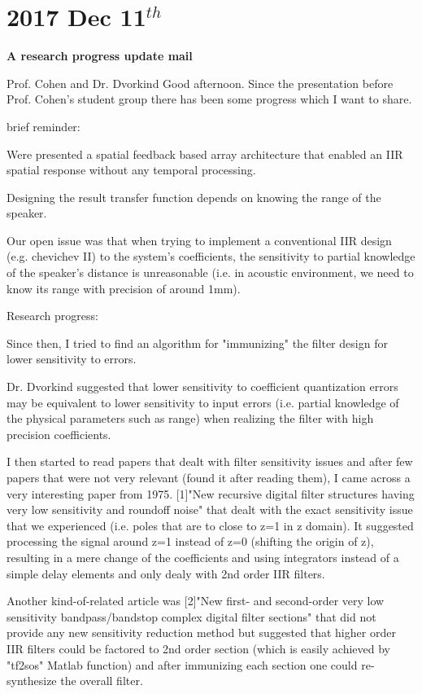 \documentclass[12pt]{article}
\begin{document}
\section{2017 Dec 11$^{th}$}
\textbf{A research progress update mail} 

\begin{mdframed}
Prof. Cohen and Dr. Dvorkind 
Good afternoon. 
Since the presentation before Prof. Cohen's student group there has been some progress which I want to share.

brief reminder:

Were presented a spatial feedback based array architecture that enabled an IIR spatial response without any temporal processing.

Designing the result transfer function depends on knowing the range of the speaker. 

Our open issue was that when trying to implement a conventional IIR design (e.g. chevichev II) to the system's coefficients, the sensitivity to partial knowledge of the speaker's distance is unreasonable (i.e. in acoustic environment, we need to know its range with precision of around 1mm).

Research progress:

Since then, I tried to find an algorithm for "immunizing" the filter design for lower sensitivity to errors.

Dr. Dvorkind suggested that lower sensitivity to coefficient quantization errors may be equivalent to lower sensitivity to input errors (i.e. partial knowledge of the physical parameters such as range) when realizing the filter with high precision coefficients.

I then started to read papers that dealt with filter sensitivity issues and after few papers that were not very relevant (found it after reading them), I came across a very interesting paper from 1975.
[1]"New recursive digital filter structures having very low sensitivity and roundoff noise"
that dealt with the exact sensitivity issue that we experienced (i.e. poles that are to close to z=1 in z domain).
It suggested processing the signal around z=1 instead of z=0 (shifting the origin of z), resulting in a mere change of the coefficients and using integrators instead of a simple delay elements and only dealy with 2nd order IIR filters.

Another kind-of-related article was 
[2]"New first- and second-order very low sensitivity bandpass/bandstop complex digital filter sections"
that did not provide any new sensitivity reduction method but suggested that higher order IIR filters could be factored to 2nd order section (which is easily achieved by "tf2sos" Matlab function) and after immunizing each section one could re-synthesize the overall filter.


\end{mdframed}
\end{document}
